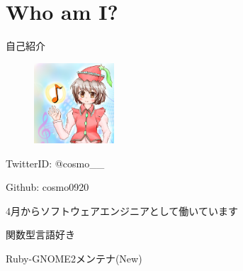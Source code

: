 \section{Who am I?}

\begin{frame}
\begin{block}{自己紹介}
{\Large
\begin{figure}
\begin{center}
\includegraphics[width=3cm]{img/icon.png}
\end{center}
\end{figure}

TwitterID: @cosmo\_\_

Github: cosmo0920

4月からソフトウェアエンジニアとして働いています

関数型言語好き

Ruby-GNOME2メンテナ(New)

}
\end{block}
\end{frame}
